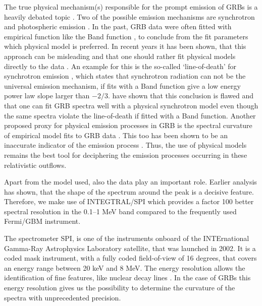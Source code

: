 \documentclass[twocolumn,traditabstract]{aa}
\begin{document}
The true physical mechanism(s) responsible for the prompt emission of GRBs is a heavily debated topic \citep[for a review see][]{KumarZhang2015}. %
Two of the possible emission mechanisms are synchrotron \citep[e.g.][]{syn_shell, bosnjak_syn, synch} and photospheric emission \citep[e.g.][]{Goodman1986, photo_1, photo_2, photo_3}. In the past, GRB data were often fitted with empirical function like the Band function \citep{band}, to conclude from the fit parameters which physical model is preferred. In recent years it has been shown, that this approach can be misleading and that one should rather fit physical models directly to the data \citep{Burgess-2014, physical_models, synch}. An example for this is the so-called `line-of-death' for synchrotron emission \citep{line-of-death, line-of-death2}, which states that synchrotron radiation can not be the universal emission mechanism, if fits with a Band function give a low energy power law slope larger than $-2/3$. \citet{synch} have shown that this conclusion is flawed and that one can fit GRB spectra well with a physical synchrotron model even though the same spectra violate the line-of-death if fitted with a Band function. Another proposed proxy for physical emission processes in GRB  is the spectral curvature of empirical model fits to GRB data \citep{Yu-2015, Axelsson-2015}. This too has been shown to be an inaccurate indicator of the emission process \citep{Burgess2019}. Thus, the use of physical models remains the best tool for deciphering the emission processes occurring in these relativistic outflows.

Apart from the model used, also the data play an important role. Earlier analysis has shown, that the shape of the spectrum around the peak is a decisive feature. Therefore, we make use of INTEGTRAL/SPI which provides a factor 100 better spectral resolution in the 0.1--1 MeV band compared to the frequently used Fermi/GBM instrument.

The spectrometer SPI, is one of the instruments onboard of the INTErnational Gamma-Ray Astrophysics Laboratory \citep[INTEGRAL;][]{integral} satellite, that was launched in 2002. It is a coded mask instrument, with a fully coded field-of-view of 16 degrees, that covers an energy range between 20 keV and 8 MeV. The energy resolution allows the identification of fine features, like nuclear decay lines \citep{spi_main}. In the case of GRBs this energy resolution gives us the possibility to determine the curvature of the spectra with unprecedented precision.
\end{document}
